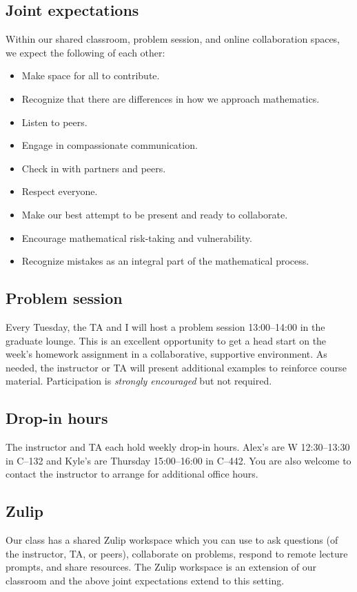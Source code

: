 \documentclass[11pt,twoside]{amsart}
\begin{document}
\subsection*{Joint expectations}
Within our shared classroom, problem session, and online collaboration spaces, we expect the following of each other:
\begin{itemize}
\item Make space for all to contribute.
\item Recognize that there are differences in how we approach mathematics.
\item Listen to peers.
\item Engage in compassionate communication.
\item Check in with partners and peers.
\item Respect everyone.
\item Make our best attempt to be present and ready to collaborate.
\item Encourage mathematical risk-taking and vulnerability.
\item Recognize mistakes as an integral part of the mathematical process.
\end{itemize}

\subsection*{Problem session}
Every Tuesday, the TA and I will host a problem session 13:00--14:00 in the graduate lounge. This is an excellent opportunity to get a head start on the week's homework assignment in a collaborative, supportive environment. As needed, the instructor or TA will present additional examples to reinforce course material. Participation is \emph{strongly encouraged} but not required.

\subsection*{Drop-in hours}
The instructor and TA each hold weekly drop-in hours. Alex's are W 12:30--13:30 in C--132 and Kyle's are Thursday 15:00--16:00 in C--442. You are also welcome to contact the instructor to arrange for additional office hours.

\subsection*{Zulip}
Our class has a shared Zulip workspace which you can use to ask questions (of the instructor, TA, or peers), collaborate on problems, respond to remote lecture prompts, and share resources. The Zulip workspace is an extension of our classroom and the above joint expectations extend to this setting.
\end{document}
